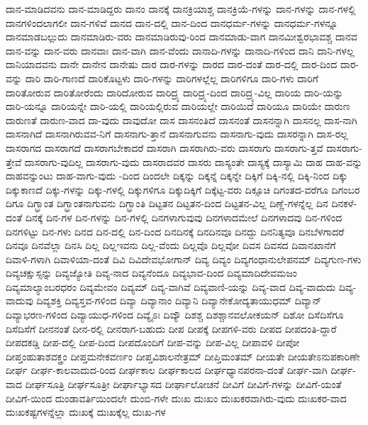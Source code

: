 {ದಾನ-ಮಾಡಿದವನು
ದಾನ-ಮಾಡಿದ್ದರು
ದಾನಂ
ದಾನಕ್ಕೆ
ದಾನಕ್ರಿಯಾಶ್ಚ
ದಾನಕ್ರಿಯೆ-ಗಳನ್ನು
ದಾನ-ಗಳನ್ನು
ದಾನ-ಗಳಲ್ಲಿ
ದಾನಗಳಿಂದಲಾಗಲೀ
ದಾನ-ಗಳಿವೆ
ದಾನದ
ದಾನ-ದಲ್ಲಿ
ದಾನ-ದಿಂದ
ದಾನಧರ್ಮ-ಗಳನ್ನು
ದಾನಧರ್ಮ-ಗಳನ್ನೂ
ದಾನಮಾಡಬಲ್ಲುದು
ದಾನಮಾಡಿರು-ವರು
ದಾನಮಾಡಿರುವು-ರಿಂದ
ದಾನಮಾಡು-ವಾಗ
ದಾನಮೀಶ್ವರಭಾವಶ್ಚ
ದಾನವ
ದಾನ-ವನ್ನು
ದಾನ-ವರು
ದಾನವಾಃ
ದಾನ-ವಾಗಿ
ದಾನ-ವೆಂದು
ದಾನಾದಿ-ಗಳನ್ನು
ದಾನಾದಿ-ಗಳಿಂದ
ದಾನಿ
ದಾನಿ-ಗಳಲ್ಲ
ದಾನಿಯಾದವನು
ದಾನೇ
ದಾನೇನ
ದಾನೇಷು
ದಾರ
ದಾರ-ಗಳನ್ನು
ದಾರದ
ದಾರ-ದಂತೆ
ದಾರ-ದಲ್ಲಿ
ದಾರ-ದಿಂದ
ದಾರ-ವನ್ನು
ದಾರಿ
ದಾರಿ-ಗಾಣದೆ
ದಾರಿಕೊಟ್ಟಳು
ದಾರಿ-ಗಳನ್ನು
ದಾರಿಗಳಲ್ಲೆಲ್ಲ
ದಾರಿಗಳಿಗೂ
ದಾರಿ-ಗಳು
ದಾರಿಗೆ
ದಾರಿತೋರುವ
ದಾರಿತೋರೆಂದು
ದಾರಿದೋರುವ
ದಾರಿದ್ರ್ಯ
ದಾರಿದ್ರ್ಯ-ದಿಂದ
ದಾರಿದ್ರ್ಯ-ವಿಲ್ಲ
ದಾರಿಯ
ದಾರಿ-ಯನ್ನು
ದಾರಿ-ಯನ್ನೂ
ದಾರಿಯನ್ನೇ
ದಾರಿ-ಯಲ್ಲಿ
ದಾರಿಯಲ್ಲಿರುವ
ದಾರಿಯಲ್ಲೇ
ದಾರಿಯಿದೆ
ದಾರಿಯೂ
ದಾರಿಯೇ
ದಾರುಣ
ದಾರುಣತೆ
ದಾರುಣ-ವಾದ
ದಾ-ವುದು
ದಾವುದೋ
ದಾಸ
ದಾಸನಂತಿದೆ
ದಾಸನಂತೆ
ದಾಸನನ್ನಾಗಿ
ದಾಸನಲ್ಲ
ದಾಸ-ನಾಗಿ
ದಾಸನಾಗಿದೆ
ದಾಸನಾಗಿರುವವ-ನಿಗೆ
ದಾಸನಾಗು-ತ್ತಾನೆ
ದಾಸನಾಗುವನು
ದಾಸನಾಗು-ವುದು
ದಾಸರನ್ನಾಗಿ
ದಾಸ-ರಲ್ಲ
ದಾಸರಾಗದ
ದಾಸರಾಗದೆ
ದಾಸರಾಗಬೇಕಾದರೆ
ದಾಸರಾಗಿ
ದಾಸರಾಗಿರು-ವರು
ದಾಸರಾಗು
ದಾಸರಾಗು-ತ್ತವೆ
ದಾಸರಾಗು-ತ್ತೇವೆ
ದಾಸರಾಗು-ವುದಿಲ್ಲ
ದಾಸರಾಗು-ವುದು
ದಾಸರಾದವರ
ದಾಸರು
ದಾಸ್ಯಂತೇ
ದಾಸ್ಯಕ್ಕೆ
ದಾಸ್ಯಾಮಿ
ದಾಹ
ದಾಹ-ವನ್ನು
ದಾಹವನ್ನುಂಟು
ದಾಹ-ವಾಗು-ವುದು
-ದಿಂದ
ದಿಂದಲೇ
ದಿಕ್ಕನ್ನು
ದಿಕ್ಕನ್ನೆ
ದಿಕ್ಕನ್ನೇ
ದಿಕ್ಕಿಗೆ
ದಿಕ್ಕಿ-ನಲ್ಲಿ
ದಿಕ್ಕಿ-ನಿಂದ
ದಿಕ್ಕು
ದಿಕ್ಕುಕಾಣದೆ
ದಿಕ್ಕು-ಗಳನ್ನು
ದಿಕ್ಕು-ಗಳಲ್ಲಿ
ದಿಕ್ಕುಗಳಿಗೂ
ದಿಕ್ಕುದಿಕ್ಕಿಗೆ
ದಿಕ್ಕೆಟ್ಟ-ವರು
ದಿಕ್ಸೂಚಿ
ದಿಗಂತದ-ವರೆಗೂ
ದಿಗಂಬರ
ದಿಗೂ
ದಿಗ್ಭ್ರಾಂತ
ದಿಗ್ಭ್ರಾಂತನಾಗುವನು
ದಿಗ್ಭ್ರಾಂತಿ
ದಿಟ್ಟತನ
ದಿಟ್ಟತನ-ದಿಂದ
ದಿಟ್ಟತನ-ವಿಲ್ಲ
ದಿಣ್ಣೆ-ಗಳನ್ನೆಲ್ಲ
ದಿನ
ದಿನಕಳೆ-ದಂತೆ
ದಿನಕ್ಕೆ
ದಿನ-ಗಳ
ದಿನ-ಗಳನ್ನು
ದಿನ-ಗಳಲ್ಲಿ
ದಿನಗಳಾಗುವುವು
ದಿನಗಳಾದಮೇಲೆ
ದಿನಗಳಾದವು
ದಿನ-ಗಳಿಂದ
ದಿನಗಳಿಟ್ಟು
ದಿನ-ಗಳು
ದಿನದ
ದಿನ-ದಲ್ಲಿ
ದಿನ-ದಿಂದ
ದಿನದಿನಕ್ಕೆ
ದಿನದಿನವೂ
ದಿನದ್ದು
ದಿನನಿತ್ಯವೂ
ದಿನಬೆಳಗಾದರೆ
ದಿನವೂ
ದಿನವೆಲ್ಲಾ
ದಿನಸಿ
ದಿಲ್ಲ
ದಿಲ್ಲಇವನು
ದಿಲ್ಲ-ವೆಂದು
ದಿಲ್ಲವೊ
ದಿಲ್ಲವೋ
ದಿವಸ
ದಿವಸದ
ದಿವಾನಖಾನೆಗೆ
ದಿವಾಳಿ-ಗಳಾಗಿ
ದಿವಾಳಿಯಾ-ದಂತೆ
ದಿವಿ
ದಿವಿದೇವಭೋಗಾನ್
ದಿವ್ಯ
ದಿವ್ಯಂ
ದಿವ್ಯಗಂಧಾನುಲೇಪನಮ್
ದಿವ್ಯಗುಣ-ಗಳು
ದಿವ್ಯಚಕ್ಷುಸ್ಸನ್ನು
ದಿವ್ಯಜ್ಯೋತಿ
ದಿವ್ಯ-ನಾದ
ದಿವ್ಯನೆಂದೂ
ದಿವ್ಯಭಾವ-ದಿಂದ
ದಿವ್ಯಮಾದಿದೇವಮಜಂ
ದಿವ್ಯಮಾಲ್ಯಾಂಬರಧರಂ
ದಿವ್ಯಮೇವಂ
ದಿವ್ಯಮ್
ದಿವ್ಯ-ವಾಗಿವೆ
ದಿವ್ಯವಾಣಿ-ಯನ್ನು
ದಿವ್ಯ-ವಾದ
ದಿವ್ಯ-ವಾದುದು
ದಿವ್ಯ-ವಾದುವು
ದಿವ್ಯಶಕ್ತಿ
ದಿವ್ಯಸ್ತವ-ಗಳಿಂದ
ದಿವ್ಯಾ
ದಿವ್ಯಾನಾಂ
ದಿವ್ಯಾನಿ
ದಿವ್ಯಾನೇಕೋದ್ಯತಾಯುಧಮ್
ದಿವ್ಯಾನ್
ದಿವ್ಯಾಭರಣ-ಗಳಿಂದ
ದಿವ್ಯಾಯುಧ-ಗಳಿಂದ
ದಿವ್ಯೈಽಃ
ದಿವ್ಯೌ
ದಿಶಶ್ಚ
ದಿಶಶ್ಚಾನವಲೋಕಯನ್
ದಿಶೋ
ದಿಸೆದಿಸೆಗೂ
ದಿಸೆದಿಸೆಗೆ
ದೀನನಂತೆ
ದೀನ-ರಲ್ಲಿ
ದೀನರಾಗ-ಬಹುದು
ದೀಪ
ದೀಪಕ್ಕೆ
ದೀಪಗಳಿ-ವರು
ದೀಪದ
ದೀಪದಂತಿ-ದ್ದಾರೆ
ದೀಪದಕಡ್ಡಿ
ದೀಪ-ದಲ್ಲಿ
ದೀಪ-ದಿಂದ
ದೀಪದೊಂದಿಗೆ
ದೀಪ-ವನ್ನು
ದೀಪ-ವಿಲ್ಲ
ದೀಪಾವಳಿ
ದೀಪೋ
ದೀಪ್ತಂಹುತಾಶವಕ್ತ್ರಂ
ದೀಪ್ತಮನೇಕವರ್ಣಂ
ದೀಪ್ತವಿಶಾಲನೇತ್ರಮ್
ದೀಪ್ತಿಮಂತಮ್
ದೀಯತೇ
ದೀಯತೇಽನುಪಕಾರಿಣೇ
ದೀರ್ಘ
ದೀರ್ಘ-ಕಾಲವಾದುದ-ರಿಂದ
ದೀರ್ಘಕಾಲ
ದೀರ್ಘಕಾಲದ
ದೀರ್ಘಧ್ಯಾನಪರನಾ-ದಂತೆ
ದೀರ್ಘ-ವಾಗಿ
ದೀರ್ಘ-ವಾದ
ದೀರ್ಘಸೂತ್ರಿ
ದೀರ್ಘಸೂತ್ರೀ
ದೀರ್ಘಾಭ್ಯಾಸದ
ದೀರ್ಘಾಲೋಚನೆ
ದೀವಿಗೆ
ದೀವಿಗೆ-ಗಳನ್ನು
ದೀವಿಗೆ-ಯಂತೆ
ದೀವಿಗೆ-ಯಿಂದ
ದುಂಡಾವರ್ತಿಯಿಂದಲೇ
ದುಂಬಿ-ಗಳೇ
ದುಃಖ
ದುಃಖಂ
ದುಃಖಕರವಾಗಿರು-ವುದು
ದುಃಖಕರ-ವಾದ
ದುಃಖಕಷ್ಟಗಳನ್ನೆಲ್ಲಾ
ದುಃಖಕ್ಕೆ
ದುಃಖಕ್ಕೆಲ್ಲ
ದುಃಖ-ಗಳ
}
